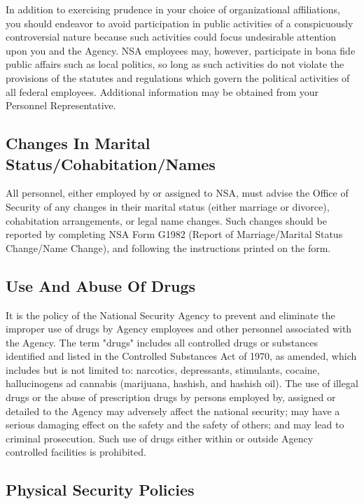 \documentclass[a4]{article}
\begin{document}
In addition to exercising prudence in your choice of organizational
affiliations, you should endeavor to avoid participation in public activities
of a conspicuously controversial nature because such activities could focus
undesirable attention upon you and the Agency.  NSA employees may, however,
participate in bona fide public affairs such as local politics, so long as such
activities do not violate the provisions of the statutes and regulations which
govern the political activities of all federal employees.  Additional
information may be obtained from your Personnel Representative.

\subsection{Changes In Marital Status/Cohabitation/Names}

All personnel, either employed by or assigned to NSA, must advise the Office of
Security of any changes in their marital status (either marriage or divorce),
cohabitation arrangements, or legal name changes.  Such changes should be
reported by completing NSA Form G1982 (Report of Marriage/Marital Status
Change/Name Change), and following the instructions printed on the form.

\subsection{Use And Abuse Of Drugs}

It is the policy of the National Security Agency to prevent and eliminate the
improper use of drugs by Agency employees and other personnel associated with
the Agency.  The term "drugs" includes all controlled drugs or substances
identified and listed in the Controlled Substances Act of 1970, as amended,
which includes but is not limited to:  narcotics, depressants, stimulants,
cocaine, hallucinogens ad cannabis (marijuana, hashish, and hashish oil).
The use of illegal drugs or the abuse of prescription drugs by persons employed
by, assigned or detailed to the Agency may adversely affect the national
security; may have a serious damaging effect on the safety and the safety of
others; and may lead to criminal prosecution.  Such use of drugs either within
or outside Agency controlled facilities is prohibited.

\subsection{Physical Security Policies}
\end{document}
